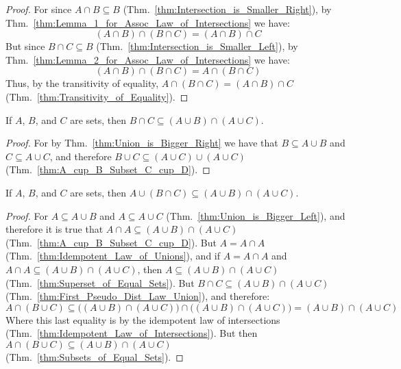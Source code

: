         \begin{proof}
            For since $A\cap{B}\subseteq{B}$
            (Thm.~\ref{thm:Intersection_is_Smaller_Right}), by
            Thm.~\ref{thm:Lemma_1_for_Assoc_Law_of_Intersections} we have:
            \begin{equation}
                (A\cap{B})\cap(B\cap{C})=(A\cap{B})\cap{C}
            \end{equation}
            But since $B\cap{C}\subseteq{B}$
            (Thm.~\ref{thm:Intersection_is_Smaller_Left}),
            by Thm.~\ref{thm:Lemma_2_for_Assoc_Law_of_Intersections} we have:
            \begin{equation}
                (A\cap{B})\cap(B\cap{C})=A\cap(B\cap{C})
            \end{equation}
            Thus, by the transitivity of equality,
            $A\cap(B\cap{C})=(A\cap{B})\cap{C}$
            (Thm.~\ref{thm:Transitivity_of_Equality}).
        \end{proof}
        \begin{theorem}
            \label{thm:First_Pseudo_Dist_Law_Union}%
            If $A$, $B$, and $C$ are sets, then
            $B\cap{C}\subseteq(A\cup{B})\cap(A\cup{C})$.
        \end{theorem}
        \begin{proof}
            For by Thm.~\ref{thm:Union_is_Bigger_Right} we have that
            $B\subseteq{A}\cup{B}$ and $C\subseteq{A}\cup{C}$, and therefore
            $B\cup{C}\subseteq(A\cup{C})\cup(A\cup{C})$
            (Thm.~\ref{thm:A_cup_B_Subset_C_cup_D}).
        \end{proof}
        \begin{theorem}
            \label{thm:Second_Pseudo_Dist_Law_Union}%
            If $A$, $B$, and $C$ are sets, then
            $A\cup(B\cap{C})\subseteq(A\cup{B})\cap(A\cup{C})$.
        \end{theorem}
        \begin{proof}
            For $A\subseteq{A}\cup{B}$ and $A\subseteq{A}\cup{C}$
            (Thm.~\ref{thm:Union_is_Bigger_Left}), and therefore it is true that
            $A\cap{A}\subseteq(A\cup{B})\cap(A\cup{C})$
            (Thm.~\ref{thm:A_cup_B_Subset_C_cup_D}). But $A=A\cap{A}$
            (Thm.~\ref{thm:Idempotent_Law_of_Unions}), and if
            $A=A\cap{A}$ and $A\cap{A}\subseteq(A\cup{B})\cap(A\cup{C})$, then
            $A\subseteq(A\cup{B})\cap(A\cup{C})$
            (Thm.~\ref{thm:Superset_of_Equal_Sets}). But
            $B\cap{C}\subseteq(A\cup{B})\cap(A\cup{C})$
            (Thm.~\ref{thm:First_Pseudo_Dist_Law_Union}), and therefore:
            \begin{equation}
                A\cap(B\cup{C})\subseteq
                \big((A\cup{B})\cap(A\cup{C})\big)\cap
                \big((A\cup{B})\cap(A\cup{C})\big)
                =(A\cup{B})\cap(A\cup{C})
            \end{equation}
            Where this last equality is by the idempotent law of intersections
            (Thm.~\ref{thm:Idempotent_Law_of_Intersections}). But then
            $A\cap(B\cup{C})\subseteq(A\cup{B})\cap(A\cup{C})$
            (Thm.~\ref{thm:Subsets_of_Equal_Sets}).
        \end{proof}

